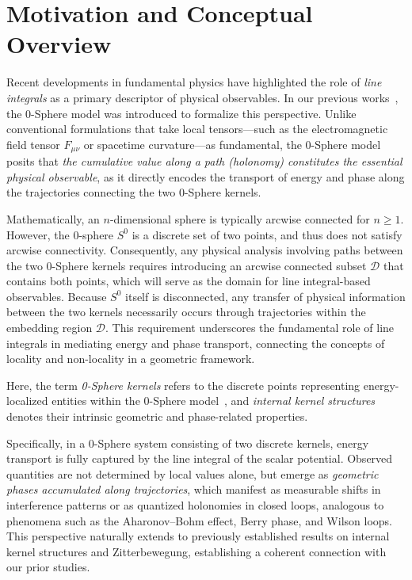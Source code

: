 \documentclass[%
 reprint,
 amsmath,amssymb,
 aps,
 prb,
]{revtex4-2}
\numberwithin{equation}{section}
\begin{document}
\section{Motivation and Conceptual Overview}
\label{sec:motivation}

Recent developments in fundamental physics have highlighted the role of \emph{line integrals} as a primary descriptor of physical observables. 
In our previous works~\cite{hanamura18067760,hanamura18135855,hanamura18203433}, the 0-Sphere model was introduced to formalize this perspective. 
Unlike conventional formulations that take local tensors—such as the electromagnetic field tensor $F_{\mu\nu}$ or spacetime curvature—as fundamental, the 0-Sphere model posits that \emph{the cumulative value along a path (holonomy) constitutes the essential physical observable}, as it directly encodes the transport of energy and phase along the trajectories connecting the two 0-Sphere kernels.

Mathematically, an $n$-dimensional sphere is typically arcwise connected for $n \ge 1$. 
However, the 0-sphere $S^0$ is a discrete set of two points, and thus does not satisfy arcwise connectivity. 
Consequently, any physical analysis involving paths between the two 0-Sphere kernels requires introducing an arcwise connected subset $\mathcal{D}$ that contains both points, which will serve as the domain for line integral-based observables. 
Because $S^0$ itself is disconnected, any transfer of physical information between the two kernels necessarily occurs through trajectories within the embedding region $\mathcal{D}$. 
This requirement underscores the fundamental role of line integrals in mediating energy and phase transport, connecting the concepts of locality and non-locality in a geometric framework.

Here, the term \emph{0-Sphere kernels} refers to the discrete points representing energy-localized entities within the 0-Sphere model~\cite{hanamura18067760}, and \emph{internal kernel structures} denotes their intrinsic geometric and phase-related properties.

Specifically, in a 0-Sphere system consisting of two discrete kernels, energy transport is fully captured by the line integral of the scalar potential. 
Observed quantities are not determined by local values alone, but emerge as \emph{geometric phases accumulated along trajectories}, which manifest as measurable shifts in interference patterns or as quantized holonomies in closed loops, analogous to phenomena such as the Aharonov--Bohm effect, Berry phase, and Wilson loops. 
This perspective naturally extends to previously established results on internal kernel structures and Zitterbewegung, establishing a coherent connection with our prior studies.
\end{document}
